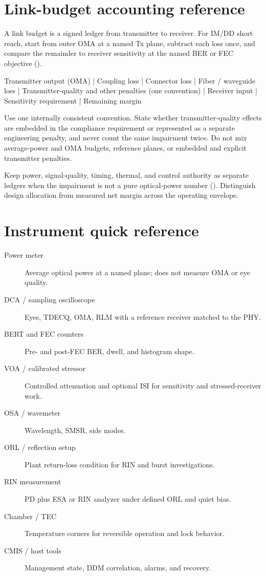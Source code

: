 \section{Link-budget accounting reference}
\label{sec:link-budget}

A link budget is a signed ledger from transmitter to receiver. For IM/DD short
reach, start from outer OMA at a named Tx plane, subtract each loss once, and
compare the remainder to receiver sensitivity at the named BER or FEC objective
().

\begin{dectree}
Transmitter output (OMA)
  |
Coupling loss
  |
Connector loss
  |
Fiber / waveguide loss
  |
Transmitter-quality and other penalties (one convention)
  |
Receiver input
  |
Sensitivity requirement
  |
Remaining margin
\end{dectree}

Use one internally consistent convention. State whether transmitter-quality
effects are embedded in the compliance requirement or represented as a separate
engineering penalty, and never count the same impairment twice. Do not mix
average-power and OMA budgets, reference planes, or embedded and explicit
transmitter penalties.

Keep power, signal-quality, timing, thermal, and control authority as separate
ledgers when the impairment is not a pure optical-power number
(). Distinguish design
allocation from measured net margin across the operating envelope.

\section{Instrument quick reference}

\begin{description}
\item[Power meter] Average optical power at a named plane; does not measure OMA
      or eye quality.
\item[DCA / sampling oscilloscope] Eyes, TDECQ, OMA, RLM with a reference
      receiver matched to the PHY.
\item[BERT and FEC counters] Pre- and post-FEC BER, dwell, and histogram shape.
\item[VOA / calibrated stressor] Controlled attenuation and optional ISI for
      sensitivity and stressed-receiver work.
\item[OSA / wavemeter] Wavelength, SMSR, side modes.
\item[ORL / reflection setup] Plant return-loss condition for RIN and burst
      investigations.
\item[RIN measurement] PD plus ESA or RIN analyzer under defined ORL and quiet
      bias.
\item[Chamber / TEC] Temperature corners for reversible operation and lock
      behavior.
\item[CMIS / host tools] Management state, DDM correlation, alarms, and
      recovery.
\end{description}

